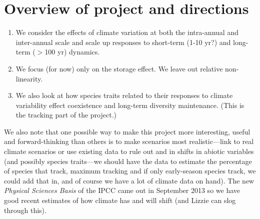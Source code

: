 \documentclass[11pt,a4paper,oneside]{article}
\begin{document}
\section{Overview of project and directions}
\noindent 
\begin{enumerate}
\item We consider the effects of climate variation at both the
intra-annual and inter-annual scale and scale up responses to
short-term (1-10 yr?) and long-term (\(>\)100 yr) dynamics. 
\item We focus (for now) only on the storage effect. We leave out relative non-linearity.
\item We also look at how species traits related to their responses to
  climate variability effect coexistence and long-term diversity
  maintenance. (This is the tracking part of the project.) 
\end{enumerate}

\noindent We also note that one possible way to make this project more
interesting, useful and forward-thinking than others is to make
scenarios most realistic---link to real climate scenarios or use
existing data to rule out and in shifts in abiotic variables (and
possibly species traits---we should have the data to estimate the
percentage of species that track, maximum tracking and if only
early-season species track, we could add that in, and of course we
have a lot of climate data on hand). The new \emph{Physical Sciences Basis} of the IPCC came out in September 2013 so we have good recent estimates of how climate has and will shift (and Lizzie can slog through this).
\end{document}
